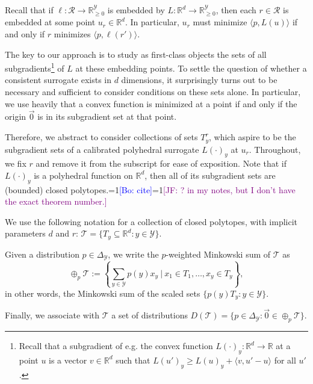 \documentclass[anon]{colt2020} %
\newcommand{\Comments}{1}
\newcommand{\mynote}[2]{\ifnum\Comments=1\textcolor{#1}{#2}\fi}
\newcommand{\jessie}[1]{\mynote{purple}{[JF: #1]}}
\newcommand{\bo}[1]{\mynote{blue}{[Bo: #1]}}
\newcommand{\reals}{\mathbb{R}}
\newcommand{\nonnegreals}{\reals_{\geq 0}}%
\newcommand{\simplex}{\Delta_\Y}
\newcommand{\R}{\mathcal{R}}
\newcommand{\T}{\mathcal{T}}
\newcommand{\Y}{\mathcal{Y}}
\newcommand{\inprod}[2]{\langle #1, #2 \rangle}%
\begin{document}
Recall that if $\ell: \R \to \nonnegreals^{\Y}$ is embedded by $L: \reals^d \to \nonnegreals^{\Y}$, then each $r \in \R$ is embedded at some point $u_r \in \reals^d$.
In particular, $u_r$ must minimize $\inprod{p}{L(u)}$ if and only if $r$ minimizes $\inprod{p}{\ell(r')}$.

The key to our approach is to study as first-class objects the sets of all subgradients\footnote{Recall that a subgradient of e.g. the convex function $L(\cdot)_y: \reals^d \to \reals$ at a point $u$ is a vector $v \in \reals^d$ such that $L(u')_y \geq L(u)_y + \inprod{v}{u'-u}$ for all $u'$.} of $L$ at these embedding points.
To settle the question of whether a consistent surrogate exists in $d$ dimensions, it surprisingly turns out to be necessary and sufficient to consider conditions on these sets alone.
In particular, we use heavily that a convex function is minimized at a point if and only if the origin $\vec{0}$ is in its subgradient set at that point.

Therefore, we abstract to consider collections of sets $T^r_y$, which aspire to be the subgradient sets of a calibrated polyhedral surrogate $L(\cdot)_y$ at $u_r$.
Throughout, we fix $r$ and remove it from the subscript for ease of exposition.
Note that if $L(\cdot)_y$ is a polyhedral function on $\reals^d$, then all of its subgradient sets are (bounded) closed polytopes.\bo{cite}\jessie{\cite{rockafellar1997convex} ? in my notes, but I don't have the exact theorem number.}

\begin{definition}[$\T$, $D(\T)$]
  We use the following notation for a collection of closed polytopes, with implicit parameters $d$ and $r$: $\T = \{T_y \subseteq \reals^d : y \in \Y\}$.

  Given a distribution $p \in \simplex$, we write the $p$-weighted Minkowski sum of $\T$ as
    \[ \oplus_p \T := \left\{ \sum_{y \in \Y} p(y) x_y ~\Big|~ x_1 \in T_1, \dots, x_y \in T_y \right\} , \]
  in other words, the Minkowski sum of the scaled sets $\{p(y) T_y : y \in \Y\}$.

  Finally, we associate with $\T$ a set of distributions $D(\T) = \{ p \in \simplex : \vec 0 \in \oplus_p \T\}$.
\end{definition}
\end{document}
